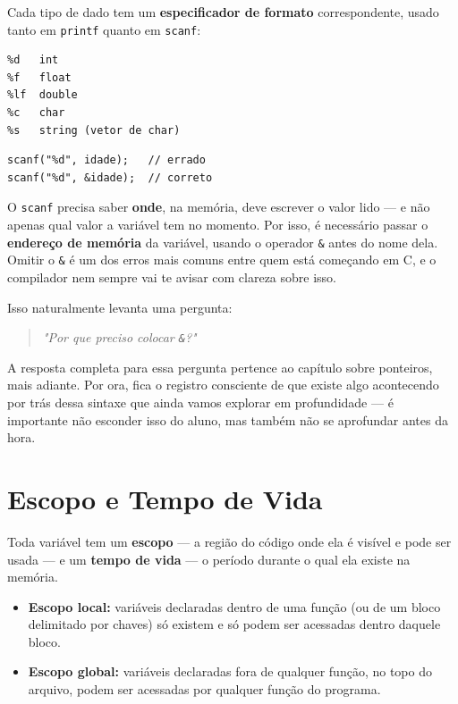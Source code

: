 \documentclass[12pt,a4paper,oneside]{extreport}
\begin{document}
Cada tipo de dado tem um \textbf{especificador de formato} correspondente, usado tanto em \texttt{printf} quanto em \texttt{scanf}:

\begin{lstlisting}
%d   int
%f   float
%lf  double
%c   char
%s   string (vetor de char)
\end{lstlisting}

\begin{errocomum}
\begin{lstlisting}
scanf("%d", idade);   // errado
scanf("%d", &idade);  // correto
\end{lstlisting}
O \texttt{scanf} precisa saber \textbf{onde}, na memória, deve escrever o valor lido — e não apenas qual valor a variável tem no momento. Por isso, é necessário passar o \textbf{endereço de memória} da variável, usando o operador \texttt{\&} antes do nome dela. Omitir o \texttt{\&} é um dos erros mais comuns entre quem está começando em C, e o compilador nem sempre vai te avisar com clareza sobre isso.
\end{errocomum}

Isso naturalmente levanta uma pergunta:

\begin{quote}
\textit{"Por que preciso colocar \texttt{\&}?"}
\end{quote}

A resposta completa para essa pergunta pertence ao capítulo sobre ponteiros, mais adiante. Por ora, fica o registro consciente de que existe algo acontecendo por trás dessa sintaxe que ainda vamos explorar em profundidade — é importante não esconder isso do aluno, mas também não se aprofundar antes da hora.

\section{Escopo e Tempo de Vida}
Toda variável tem um \textbf{escopo} — a região do código onde ela é visível e pode ser usada — e um \textbf{tempo de vida} — o período durante o qual ela existe na memória.

\begin{itemize}
    \item \textbf{Escopo local:} variáveis declaradas dentro de uma função (ou de um bloco delimitado por chaves) só existem e só podem ser acessadas dentro daquele bloco.
    \item \textbf{Escopo global:} variáveis declaradas fora de qualquer função, no topo do arquivo, podem ser acessadas por qualquer função do programa.
\end{itemize}
\end{document}
